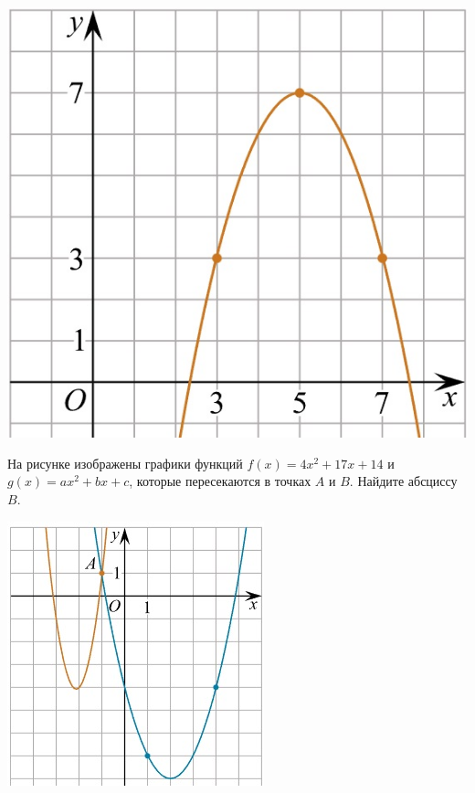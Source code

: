 \begin{class}[number=5]
\begin{listofex}
			\begin{minipage}[t]{\picwidth}
				\includegraphics[align=t, width=\linewidth]{../../pics/G101M4H2-5}
			\end{minipage}
			\item 	
			\begin{minipage}[t]{\bodywidth}
				На рисунке изображены графики функций \( f(x)=4x^2+17x+14 \) и \( g(x)=ax^2+bx+c \), которые пересекаются в точках \(A\) и \(B\). Найдите абсциссу  \( B \).
			\end{minipage}
			\hspace{0.02\linewidth}
			\begin{minipage}[t]{\bodywidth}
				\includegraphics[align=t, width=\linewidth]{../../pics/G111M3E-2}

\end{minipage}
\end{listofex}
\end{class}
